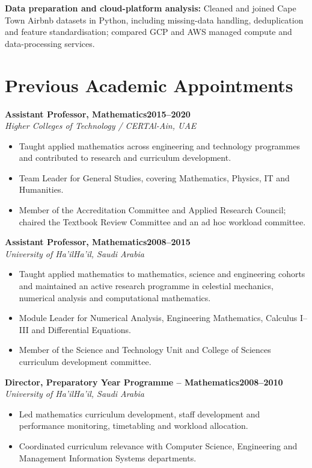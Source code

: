 \documentclass[10pt,a4paper]{article}
\newcommand{\cvrole}[4]{\textbf{#1}\hfill\textbf{#2}\\[-1pt]\textit{#3}\hfill\textit{#4}\par}
\begin{document}
\textbf{Data preparation and cloud-platform analysis:} Cleaned and joined Cape Town Airbnb datasets in Python, including missing-data handling, deduplication and feature standardisation; compared GCP and AWS managed compute and data-processing services.

\section{Previous Academic Appointments}
\cvrole{Assistant Professor, Mathematics}{2015--2020}{Higher Colleges of Technology / CERT}{Al-Ain, UAE}
\begin{itemize}
\item Taught applied mathematics across engineering and technology programmes and contributed to research and curriculum development.
\item Team Leader for General Studies, covering Mathematics, Physics, IT and Humanities.
\item Member of the Accreditation Committee and Applied Research Council; chaired the Textbook Review Committee and an ad hoc workload committee.
\end{itemize}

\cvrole{Assistant Professor, Mathematics}{2008--2015}{University of Ha'il}{Ha'il, Saudi Arabia}
\begin{itemize}
\item Taught applied mathematics to mathematics, science and engineering cohorts and maintained an active research programme in celestial mechanics, numerical analysis and computational mathematics.
\item Module Leader for Numerical Analysis, Engineering Mathematics, Calculus I--III and Differential Equations.
\item Member of the Science and Technology Unit and College of Sciences curriculum development committee.
\end{itemize}

\cvrole{Director, Preparatory Year Programme -- Mathematics}{2008--2010}{University of Ha'il}{Ha'il, Saudi Arabia}
\begin{itemize}
\item Led mathematics curriculum development, staff development and performance monitoring, timetabling and workload allocation.
\item Coordinated curriculum relevance with Computer Science, Engineering and Management Information Systems departments.
\end{itemize}
\end{document}
